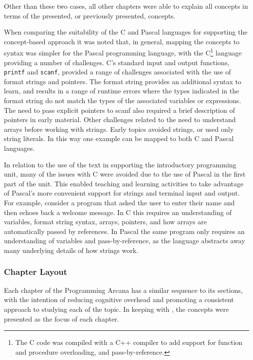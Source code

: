 Other than these two cases, all other chapters were able to explain all concepts in terms of the presented, or previously presented, concepts.

When comparing the suitability of the C and Pascal languages for supporting the concept-based approach it was noted that, in general, mapping the concepts to syntax was simpler for the Pascal programming language, with the C\footnote{The C code was compiled with a C++ compiler to add support for function and procedure overloading, and pass-by-reference.} language providing a number of challenges. C's standard input and output functions, \texttt{printf} and \texttt{scanf}, provided a range of challenges associated with the use of format strings and pointers. The format string provides an additional syntax to learn, and results in a range of runtime errors where the types indicated in the format string do not match the types of the associated variables or expressions. The need to pass explicit pointers to scanf also required a brief description of pointers in early material. Other challenges related to the need to understand arrays before working with strings. Early topics avoided strings, or used only string literals. In this way one example can be mapped to both C and Pascal languages. 

In relation to the use of the text in supporting the introductory programming unit, many of the issues with C were avoided due to the use of Pascal in the first part of the unit. This enabled teaching and learning activities to take advantage of Pascal's more convenient support for strings and terminal input and output. For example, consider a program that asked the user to enter their name and then echoes back a welcome message. In C this requires an understanding of variables, format string syntax, arrays, pointers, and how arrays are automatically passed by references. In Pascal the same program only requires an understanding of variables and pass-by-reference, as the language abstracts away many underlying details of how strings work.

\clearpage
\subsubsection{Chapter Layout} %
\label{ssub:chapter_layout}

Each chapter of the Programming Arcana has a similar sequence to its sections, with the intention of reducing cognitive overhead and promoting a consistent approach to studying each of the topic. In keeping with , the concepts were presented as the focus of each chapter.

